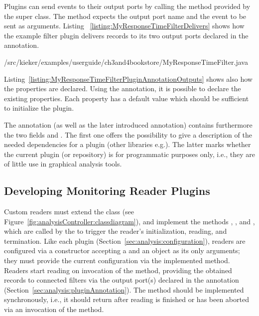 \noindent Plugins can send events to their output ports by calling the %
 method provided by the super class. The method expects the %
output port name and the event to be sent as arguments. Listing~%
\ref{listing:MyResponseTimeFilterDelivers} %
shows how the example filter plugin  delivers records %
to its two output ports declared in the  annotation.


\setJavaCodeListing
%
{\customComponentsBookstoreApplicationDir/src/kieker/examples/userguide/ch3and4bookstore/MyResponseTimeFilter.java}

Listing~\ref{listing:MyResponseTimeFilterPluginAnnotationOutputs} shows also how %
the properties are declared. Using the  annotation, it is possible to declare %
the existing properties. Each property has a default value which should be sufficient %
to initialize the plugin.%

The  annotation (as well as the later introduced  annotation) contains %
furthermore the two fields  and . The first %
one offers the possibility to give a description of the needed dependencies for a plugin %
(other libraries e.g.). The latter marks whether the current plugin (or repository) is for %
programmatic purposes only, i.e., they are of little use in graphical analysis %
tools.

\subsection{Developing Monitoring Reader Plugins}\label{sec:analysis:reader}

\noindent Custom readers must extend the class %
 (see Figure~\ref{fig:analysisController:classdiagram}), %
and implement the methods , , and , %
which are called by the  to trigger the reader's initialization, %
reading, and termination. Like each plugin (Section~\ref{sec:analysis:configuration}), %
readers are configured via a constructor accepting a  and an  object %
as its only arguments; they must provide the current configuration %
via the implemented  %
method. Readers start reading on invocation of the  method, %
providing the obtained records to connected filters via the output port(s) %
declared in the  annotation (Section~\ref{sec:analysis:pluginAnnotation}). %
The  method should be implemented synchronously, i.e., it should %
return after reading is finished or has been aborted via an invocation of the %
 method.

